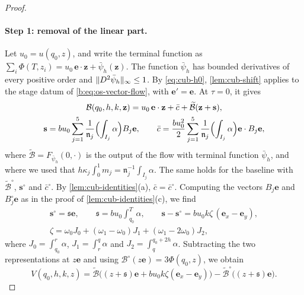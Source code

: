 \begin{proof}
\paragraph{Step 1: removal of the linear part.} Let $u_0=u(q_0,z)$, and write
the terminal function as $\sum_i\Phi(T,z_i)=u_0\,\mathbf e\cdot\mathbf
z+\bar\psi_h(\mathbf z)$. The function $\bar\psi_h$ has bounded derivatives of every positive
order and $\lVert D^2\bar\psi_h\rVert_\infty\le1$. By \eqref{eq:cub-h0}, \cref{lem:cub-shift}
applies to the stage datum of \eqref{b:eq:os-vector-flow}, with
$\mathbf e'=\mathbf e$. At $\tau=0$, it gives
\[
\begin{gathered}
 \mathcal B(q_0,h,k,\mathbf z)=u_0\,\mathbf e\cdot\mathbf z+\bar c
 +\widetilde{\mathcal B}(\mathbf z+\mathbf s),\\
 \mathbf s=bu_0\sum_{j=1}^5\frac1{\mathfrak n_j}\Bigl(\int_{I_j}\alpha\Bigr)B_j\mathbf e,\qquad
 \bar c=\frac{bu_0^2}2\sum_{j=1}^5\frac1{\mathfrak n_j}\Bigl(\int_{I_j}\alpha\Bigr)\mathbf e\cdot B_j\mathbf e,
\end{gathered}
\]
where $\widetilde{\mathcal B}=F_{\bar\psi_h}(0,\cdot)$ is the output of the flow with terminal
function $\bar\psi_h$, and where we used that
$h\kappa_j\int_0^1m_j=\mathfrak n_j^{-1}\int_{I_j}\alpha$. The same holds for the
baseline with $\widetilde{\mathcal B}^\circ$, $\mathbf s^\circ$ and $\bar c^\circ$. By
\cref{lem:cub-identities}(a), $\bar c=\bar c^\circ$. Computing the vectors $B_j\mathbf e$
and $B^\circ_j\mathbf e$ as in the proof of \cref{lem:cub-identities}(c), we find
\[
\begin{gathered}
 \mathbf s^\circ=\mathfrak s\mathbf e,\qquad \mathfrak s=bu_0\int_{q_0}^T\alpha,\qquad
 \mathbf s-\mathbf s^\circ=bu_0k\zeta\,(\mathbf e_x-\mathbf e_y),\\
 \zeta=\omega_0J_0+(\omega_1-\omega_0)J_1+(\omega_1-2\omega_0)J_2,
\end{gathered}
\]
where $J_0=\int_{q_0}^r\alpha$, $J_1=\int_r^q\alpha$ and
$J_2=\int_q^{q_0+2h}\alpha$. Subtracting the two representations at $z\mathbf e$
and using $\mathcal B^\circ(z\mathbf e)=3\Phi(q_0,z)$, we obtain
\begin{equation}\label{eq:cub-V-shift}
 V(q_0,h,k,z)=\widetilde{\mathcal B}\bigl((z+\mathfrak s)\mathbf e+bu_0k\zeta(\mathbf e_x-\mathbf e_y)\bigr)
 -\widetilde{\mathcal B}^\circ\bigl((z+\mathfrak s)\mathbf e\bigr).
\end{equation}


\end{proof}
